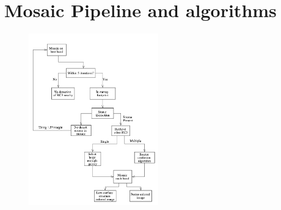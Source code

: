 \documentclass[5p]{elsarticle}
\begin{document}
\section{Mosaic Pipeline and algorithms}
	\begin{figure}[h]
		\includegraphics[width=0.5\textwidth]{figures/pipeline}
	\end{figure}
\end{document}
